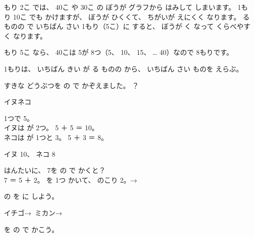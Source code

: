 もり 2こ では、 40こ や 30こ の ぼうが グラフから はみして しまいます。
1もり 10こ でも かけますが、 ぼうが ひくくて、 ちがいが えにくく なります。
る ものの で いちばん さい 1もり（5こ）に すると、 ぼうが く なって くらべやすく なります。

\par\vspace{3pt}
もり 5こ なら、 40こは 5が 8つ（5、 10、 15、 … 40）なので 8もりです。

\begin{taisetsu}
1もりは、 いちばん きい が る ものの から、 いちばん さい ものを えらぶ。
\end{taisetsu}


\begin{reidai}[\R{正}{せい}の \R{字}{じ}を \R{数}{かず}に する]
すきな どうぶつを の で かぞえました。 ？\par
\noindent\hspace*{1\zw}イヌ\enspace{}\hspace{4\zw}ネコ\enspace{}

\kangaekata {} 1つで 5。\\
イヌは が 2つ。 5 ＋ 5 ＝ 10。\\
ネコは が 1つと 3。 5 ＋ 3 ＝ 8。

\kotae イヌ 10、 ネコ 8

\noindent はんたいに、 7を の で かくと？\\
7 ＝ 5 ＋ 2。 を 1つ かいて、 のこり 2。\enspace → 
\end{reidai}

\begin{jibun}
の を に しよう。\par
\noindent\hspace*{1\zw}イチゴ\enspace{}\enspace → \bkkakikomi\,\hspace{2\zw}ミカン\enspace{}\enspace → \bkkakikomi\,
\par{}を の で かこう。\enspace\bkkakikomi[20mm]
\end{jibun}

